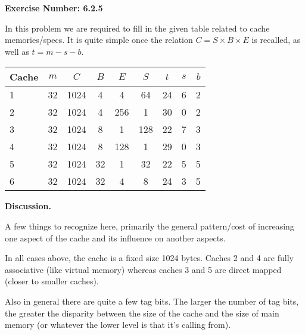 \documentclass{article}
\begin{document}
\noindent \textbf{Exercise Number: 6.2.5}  %

\medskip 

\noindent In this problem we are required to fill in the given table related to
cache memories/specs. It is quite simple once the relation $C = S \times B \times E$ is recalled, as well as $t = m - s - b$.

\bigskip

\begin{center}
  \begin{tabular}{l*{7}{c}r}
    Cache &   $m$   &   $C$   &  $B$ &   $E$  &   $S$   &   $t$   &  $s$  &   $b$   \\ \hline

    1     &   32    &   1024  &  4   &    4   &   64    &   24    &   6   &   2  \\

    2     &   32    &   1024  &  4   &   256  &  1      &   30    &   0   &  2    \\

    3     &   32    &   1024  &  8   &   1    &  128    &   22    &   7   &  3    \\

    4     &   32    &   1024  &  8    &   128 &  1      &   29    &   0   &  3    \\

    5     &   32    &   1024  &  32   &   1   &  32     &   22    &   5   &  5     \\

    6     &   32    &   1024  &  32   &  4    &  8      &   24   &   3    &  5    \\

  \end{tabular}
\end{center}

\bigskip

\bigskip

\noindent \textbf{Discussion.}

A few things to recognize here, primarily the general pattern/cost of increasing one aspect of the 
cache and its influence on another aspects.

In all cases above, the cache is a fixed size 1024 bytes. Caches 2 and 4 are fully associative
(like virtual memory) whereas caches 3 and 5 are direct mapped (closer to smaller caches).

Also in general there are quite a few tag bits. The larger the number of tag bits, the greater
the disparity between the size of the cache and the size of main memory (or whatever the lower
level is that it's calling from). 
\end{document}
